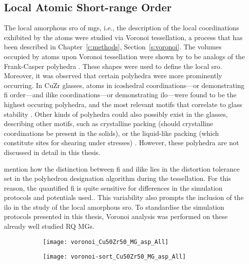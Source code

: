 \subsection{Local Atomic Short-range Order} \label{s:voro-mgs}
The local amorphous \gls{sro} of \gls{mg}s, i.e., the description of the local coordinations exhibited by the atoms were studied via Voronoi tessellation, a process that has been described in Chapter~\ref{c:methods},  Section~\ref{s:voronoi}. %
The volumes occupied by atoms upon Voronoi tessellation were shown by \textcite{Sheng2006} to be analogs of the Frank-Casper polyhedra \cite{Frank1958}. These shapes were used to define the local \gls{sro}. Moreover, it was observed that certain polyhedra were more prominently occurring. In CuZr glasses, atoms in icoshedral coordinations---or demonstrating \gls{fi} order---and \gls{ilike} coordinations---or demonstrating \gls{ilo}---were found to be the highest occuring polyhedra, and the most relevant motifs that correlate to glass stability \cite{Ding2014,Yue2018}. Other kinds of polyhedra could also possibly exist in the glasses, describing other motifs, such as crystalline packing (should crystalline coordinations be present in the solids), or the liquid-like packing (which constitute sites for shearing under stresses) \cite{Ding2014,Cheng2009,Yue2018}. However, these polyhedra are not discussed in detail in this thesis. \par

\textcite{Ding2014} mention how the distinction between \gls{fi} and \gls{ilike} lies in the distortion tolerance set in the polyhedron designation algorithm during the tessellation. For this reason, the quantified \gls{fi} is quite sensitive for differences in the simulation protocols and potentials used.\cite{Adibi2014,Avchaciov2013, Lu2018, Li2009a}. This variability also prompts the inclusion of the \gls{ilo} in the study of the local amorphous \gls{sro}. To standardise the simulation protocols presented in this thesis, Voronoi analysis was performed on these already well studied RQ MGs. \par

\begin{changebar}
\begin{figure}[h] %
	\centering
	\begin{subfigure}{0.45\linewidth} \centering \texttt{[image: voronoi\_Cu50Zr50\_MG\_asp\_All]}
		\subcaption{} \end{subfigure}%
	\begin{subfigure}{0.45\linewidth} \centering \texttt{[image: voronoi-sort\_Cu50Zr50\_MG\_asp\_All]}
		\subcaption{} \end{subfigure}
	\label{f:voro_qr}
\end{figure}
\end{changebar}

